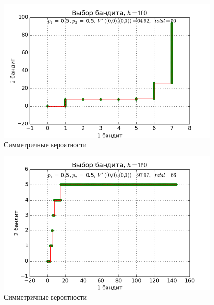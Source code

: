 \documentclass[12pt]{article}
\begin{document}
\begin{figure}
  \begin{center}
  	\caption{Симметричные вероятности}
    \includegraphics{2bandits-pic8.png}
  \end{center}
\end{figure}
\begin{figure}
  \begin{center}
  	\caption{Симметричные вероятности}
    \includegraphics{2bandits-pic9.png}
  \end{center}
\end{figure}
\newpage
\end{document}
